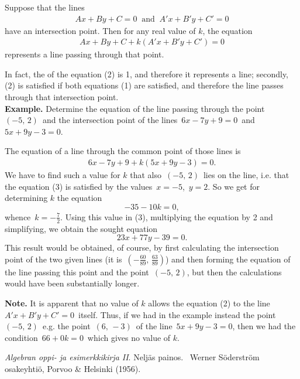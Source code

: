 \documentclass[12pt]{article}
\theoremstyle{definition}
\begin{document}
Suppose that the lines
\begin{align}
       Ax+By+C = 0\;\; \mbox{and}\;\; A'x+B'y+C' = 0
\end{align}
have an intersection point.  Then for any real value of $k$, the equation
\begin{align}
             Ax+By+C+k(A'x+B'y+C') = 0
\end{align}
represents a line passing through that point.

In fact, the  of the equation (2) is 1, and therefore it represents a line; secondly, (2) is satisfied if both equations (1) are satisfied, and therefore the line passes through that intersection point.\\


\textbf{Example.}  Determine the equation of the line passing through the point \,$(-5,\,2)$\, and the intersection point of the lines\, $6x-7y+9 = 0$\, and\, $5x+9y-3 = 0$.

The equation of a line through the common point of those lines is
\begin{align}            
           6x-7y+9 +k(5x+9y-3) = 0.
\end{align}
We have to find such a value for $k$ that also\, $(-5,\,2)$\, lies on the line, i.e. that the equation (3) is satisfied by the values\, $x = -5$,\, $y = 2$.  So we get for determining $k$ the equation
                   $$-35-10k = 0,$$
whence\, $k = -\frac{7}{2}$.  Using this value in (3), multiplying the equation by 2 and simplifying, we obtain the sought equation
                  $$23x+77y-39 = 0.$$
This result would be obtained, of course, by first calculating the intersection point of the two given lines (it is\, $(-\frac{60}{89},\,\frac{63}{89})$) and then forming the equation of the line passing this point and the point\, $(-5,\,2)$, but then the calculations would have been substantially longer.

\textbf{Note.}  It is apparent that no value of $k$ allows the equation (2) to  the line\,\\ $A'x+B'y+C' = 0$\, itself.  Thus, if we had in the example instead the point\, $(-5,\,2)$\, e.g. the point\, $(6,\,-3)$\, of the line\, $5x+9y-3 = 0$, then we had the condition\, $66+0k = 0$\, which gives no value of $k$.

\begin{thebibliography}{9}
 {\em Algebran oppi- ja esimerkkikirja II}. Nelj\"as painos. \, Werner S\"oderstr\"om osakeyhti\"o, Porvoo \& Helsinki (1956).
\end{thebibliography}
\end{document}
